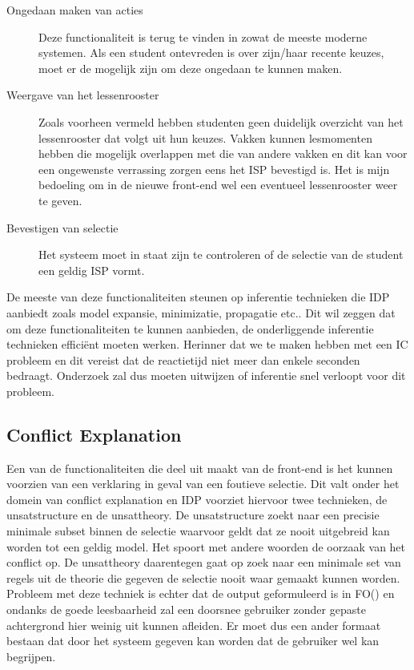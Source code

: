 \begin{description}
\item[Ongedaan maken van acties] Deze functionaliteit is terug te vinden in zowat de meeste moderne systemen. Als een student ontevreden is over zijn/haar recente keuzes, moet er de mogelijk zijn om deze ongedaan te kunnen maken. 
\item[Weergave van het lessenrooster] Zoals voorheen vermeld hebben studenten geen duidelijk overzicht van het lessenrooster dat volgt uit hun keuzes. Vakken kunnen lesmomenten hebben die mogelijk overlappen met die van andere vakken en dit kan voor een ongewenste verrassing zorgen eens het ISP bevestigd is. Het is mijn bedoeling om in de nieuwe front-end wel een eventueel lessenrooster weer te geven.
\item[Bevestigen van selectie] Het systeem moet in staat zijn te controleren of de selectie van de student een geldig ISP vormt. 
\end{description}
De meeste van deze functionaliteiten steunen op inferentie technieken die IDP aanbiedt zoals model expansie, minimizatie, propagatie etc.. Dit wil zeggen dat om deze functionaliteiten te kunnen aanbieden, de onderliggende inferentie technieken effici\"{e}nt moeten werken. Herinner dat we te maken hebben met een IC probleem en dit vereist dat de reactietijd niet meer dan enkele seconden bedraagt. Onderzoek zal dus moeten uitwijzen of inferentie snel verloopt voor dit probleem.

\subsection{Conflict Explanation}
Een van de functionaliteiten die deel uit maakt van de front-end is het kunnen voorzien van een verklaring in geval van een foutieve selectie. Dit valt onder het domein van conflict explanation en IDP voorziet hiervoor twee technieken, de unsatstructure en de unsattheory. De unsatstructure zoekt naar een precisie minimale subset binnen de selectie waarvoor geldt dat ze nooit uitgebreid kan worden tot een geldig model. Het spoort met andere woorden de oorzaak van het conflict op. De unsattheory daarentegen gaat op zoek naar een minimale set van regels uit de theorie die gegeven de selectie nooit waar gemaakt kunnen worden. Probleem met deze techniek is echter dat de output geformuleerd is in FO(\textperiodcentered) en ondanks de goede leesbaarheid zal een doorsnee gebruiker zonder gepaste achtergrond hier weinig uit kunnen afleiden. Er moet dus een ander formaat bestaan dat door het systeem gegeven kan worden dat de gebruiker wel kan begrijpen. 

